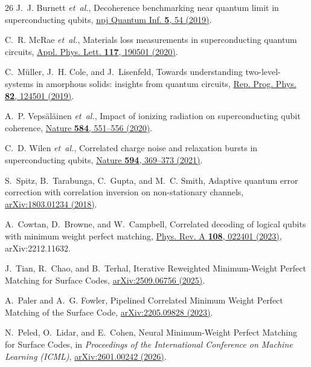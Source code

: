 \documentclass[aps,prxquantum,reprint,superscriptaddress,floatfix,nofootinbib]{revtex4-2}
\begin{document}
\begin{thebibliography}{26}
J.~J. Burnett \textit{et~al.},
\newblock Decoherence benchmarking near quantum limit in superconducting qubits,
\newblock \href{https://doi.org/10.1038/s41534-019-0168-5}{npj Quantum Inf. \textbf{5}, 54 (2019)}.

C.~R. McRae \textit{et~al.},
\newblock Materials loss measurements in superconducting quantum circuits,
\newblock \href{https://doi.org/10.1063/5.0017378}{Appl. Phys. Lett. \textbf{117}, 190501 (2020)}.

C.~M{\"u}ller, J.~H. Cole, and J.~Lisenfeld,
\newblock Towards understanding two-level-systems in amorphous solids: insights from quantum circuits,
\newblock \href{https://doi.org/10.1088/1361-6633/ab3a7e}{Rep. Prog. Phys. \textbf{82}, 124501 (2019)}.

A.~P. Veps{\"a}l{\"a}inen \textit{et~al.},
\newblock Impact of ionizing radiation on superconducting qubit coherence,
\newblock \href{https://doi.org/10.1038/s41586-020-2619-8}{Nature \textbf{584}, 551--556 (2020)}.

C.~D. Wilen \textit{et~al.},
\newblock Correlated charge noise and relaxation bursts in superconducting qubits,
\newblock \href{https://doi.org/10.1038/s41586-021-03557-5}{Nature \textbf{594}, 369--373 (2021)}.

S.~Spitz, B.~Tarabunga, C.~Gupta, and M.~C. Smith,
\newblock Adaptive quantum error correction with correlation inversion on non-stationary channels,
\newblock \href{https://arxiv.org/abs/1803.01234}{arXiv:1803.01234 (2018)}.

A.~Cowtan, D.~Browne, and W.~Campbell,
\newblock Correlated decoding of logical qubits with minimum weight perfect matching,
\newblock \href{https://doi.org/10.1103/PhysRevA.108.022401}{Phys. Rev. A \textbf{108}, 022401 (2023)}, arXiv:2212.11632.

J.~Tian, R.~Chao, and B.~Terhal,
\newblock Iterative Reweighted Minimum-Weight Perfect Matching for Surface Codes,
\newblock \href{https://arxiv.org/abs/2509.06756}{arXiv:2509.06756 (2025)}.

A.~Paler and A.~G. Fowler,
\newblock Pipelined Correlated Minimum Weight Perfect Matching of the Surface Code,
\newblock \href{https://arxiv.org/abs/2205.09828}{arXiv:2205.09828 (2023)}.

N.~Peled, O.~Lidar, and E.~Cohen,
\newblock Neural Minimum-Weight Perfect Matching for Surface Codes,
\newblock in \textit{Proceedings of the International Conference on Machine Learning (ICML)}, \href{https://arxiv.org/abs/2601.00242}{arXiv:2601.00242 (2026)}.


\end{thebibliography}
\end{document}
